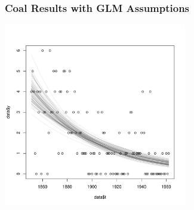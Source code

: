\documentclass{beamer}
\begin{document}
\begin{frame}[fragile]
\frametitle{Coal Results with GLM Assumptions}

\begin{center}
\includegraphics[width=0.6\textwidth]{images/coal_curves.pdf}
\end{center}
\end{frame}
\end{document}
